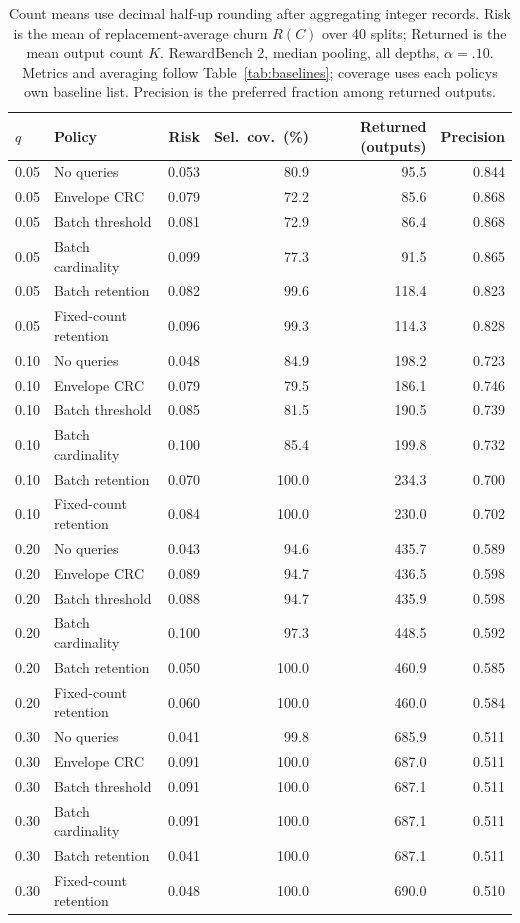 \begin{table}[t]
\centering\small
\begin{tabular}{llrrrr}
\toprule
$q$ & Policy & Risk & Sel.\ cov.\ (\%) & Returned (outputs) & Precision \\
\midrule
0.05 & No queries & 0.053 & 80.9 & 95.5 & 0.844 \\
0.05 & Envelope CRC & 0.079 & 72.2 & 85.6 & 0.868 \\
0.05 & Batch threshold & 0.081 & 72.9 & 86.4 & 0.868 \\
0.05 & Batch cardinality & 0.099 & 77.3 & 91.5 & 0.865 \\
0.05 & Batch retention & 0.082 & 99.6 & 118.4 & 0.823 \\
0.05 & Fixed-count retention & 0.096 & 99.3 & 114.3 & 0.828 \\
0.10 & No queries & 0.048 & 84.9 & 198.2 & 0.723 \\
0.10 & Envelope CRC & 0.079 & 79.5 & 186.1 & 0.746 \\
0.10 & Batch threshold & 0.085 & 81.5 & 190.5 & 0.739 \\
0.10 & Batch cardinality & 0.100 & 85.4 & 199.8 & 0.732 \\
0.10 & Batch retention & 0.070 & 100.0 & 234.3 & 0.700 \\
0.10 & Fixed-count retention & 0.084 & 100.0 & 230.0 & 0.702 \\
0.20 & No queries & 0.043 & 94.6 & 435.7 & 0.589 \\
0.20 & Envelope CRC & 0.089 & 94.7 & 436.5 & 0.598 \\
0.20 & Batch threshold & 0.088 & 94.7 & 435.9 & 0.598 \\
0.20 & Batch cardinality & 0.100 & 97.3 & 448.5 & 0.592 \\
0.20 & Batch retention & 0.050 & 100.0 & 460.9 & 0.585 \\
0.20 & Fixed-count retention & 0.060 & 100.0 & 460.0 & 0.584 \\
0.30 & No queries & 0.041 & 99.8 & 685.9 & 0.511 \\
0.30 & Envelope CRC & 0.091 & 100.0 & 687.0 & 0.511 \\
0.30 & Batch threshold & 0.091 & 100.0 & 687.1 & 0.511 \\
0.30 & Batch cardinality & 0.091 & 100.0 & 687.1 & 0.511 \\
0.30 & Batch retention & 0.041 & 100.0 & 687.1 & 0.511 \\
0.30 & Fixed-count retention & 0.048 & 100.0 & 690.0 & 0.510 \\
\bottomrule
\end{tabular}
\caption{Count means use decimal half-up rounding after aggregating integer records. Risk is the mean of replacement-average churn $R(C)$ over 40 splits; Returned is the mean output count $K$. RewardBench 2, median pooling, all depths, $\alpha=.10$. Metrics and averaging follow Table~\ref{tab:baselines}; coverage uses each policy\textquotesingle s own baseline list. Precision is the preferred fraction among returned outputs.}
\label{tab:baseline-0-median}
\end{table}
